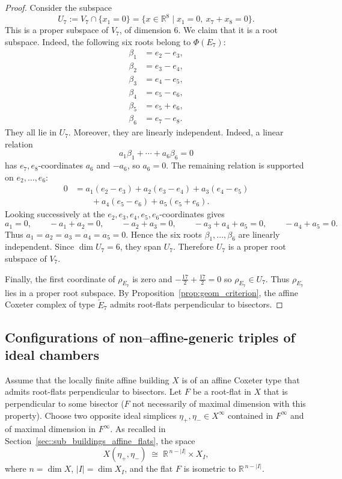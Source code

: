 \documentclass[11pt]{amsart}
\theoremstyle{plain}
\theoremstyle{definition}
\theoremstyle{remark}
\begin{document}
\begin{proof}
		Consider the subspace
		\[
		U_7
		:=
		V_7\cap\{x_1=0\}
		=
		\{x\in\mathbb R^8\mid x_1=0,\ x_7+x_8=0\}.
		\]
		This is a proper subspace of \(V_7\), of dimension \(6\). We claim that it is
		a root subspace. Indeed, the following six roots belong to \(\Phi(E_7)\):
		\[
		\begin{aligned}
			\beta_1&=e_2-e_3,\\
			\beta_2&=e_3-e_4,\\
			\beta_3&=e_4-e_5,\\
			\beta_4&=e_5-e_6,\\
			\beta_5&=e_5+e_6,\\
			\beta_6&=e_7-e_8.
		\end{aligned}
		\]
		They all lie in \(U_7\). Moreover, they are linearly independent. Indeed, a
		linear relation
		\[
		a_1\beta_1+\cdots+a_6\beta_6=0
		\]
		has \(e_7,e_8\)-coordinates \(a_6\) and \(-a_6\), so \(a_6=0\). The remaining
		relation is supported on \(e_2,\ldots,e_6\):
		\[
		\begin{aligned}
			0
			&=
			a_1(e_2-e_3)
			+a_2(e_3-e_4)
			+a_3(e_4-e_5)  \\
			&\qquad
			+a_4(e_5-e_6)
			+a_5(e_5+e_6).
		\end{aligned}
		\]
		Looking successively at the \(e_2,e_3,e_4,e_5,e_6\)-coordinates gives
		\[
		a_1=0,\qquad
		-a_1+a_2=0,\qquad
		-a_2+a_3=0,\qquad
		-a_3+a_4+a_5=0,\qquad
		-a_4+a_5=0.
		\]
		Thus \(a_1=a_2=a_3=a_4=a_5=0\). Hence the six roots
		\(\beta_1,\ldots,\beta_6\) are linearly independent. Since
		\(\dim U_7=6\), they span \(U_7\). Therefore \(U_7\) is a proper root subspace
		of \(V_7\).
		
		Finally, the first coordinate of \(\rho_{E_7}\) is zero and $-\frac{17}{2}+\frac{17}{2}=0$ so $\rho_{E_7}\in U_7$. Thus \(\rho_{E_7}\) lies in a proper root subspace. By
		Proposition~\ref{prop:geom_criterion}, the affine Coxeter complex of type
		\(\widetilde E_7\) admits root-flats perpendicular to bisectors.
		
	\end{proof}
	

	\subsection{Configurations of non--affine-generic triples of ideal chambers}
	\label{subsec::conf_non_affine_generic}
	
	Assume that the locally finite affine building \(X\) is of an affine Coxeter 
	type that admits root-flats perpendicular to bisectors. Let \(F\) be a root-flat in \(X\) that is perpendicular to some bisector ($F$ not necessarily of maximal dimension with this property).  Choose two opposite ideal simplices \(\eta_{+}, \eta_{-} \in X^{\infty}\) 
	contained in \(F^{\infty}\) and of maximal dimension in \(F^{\infty}\).  
	As recalled in Section~\ref{sec::sub_buildings_affine_flats}, the space
	\[
	X(\eta_{+}, \eta_{-}) \;\cong\; \mathbb{R}^{\,n - |I|} \times X_I,
	\]
	where \(n = \dim X\), \(|I| = \dim X_I\), and the flat \(F\) is isometric to 
	\(\mathbb{R}^{\,n - |I|}\).
	
\end{document}
